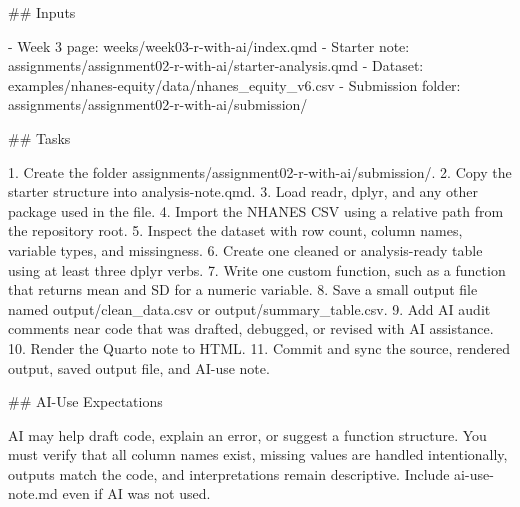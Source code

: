 \documentclass[
  letterpaper,
  DIV=11,
  numbers=noendperiod,
  oneside]{scrreprt}
\newenvironment{Shaded}{\begin{snugshade}}{\end{snugshade}}
\newcommand{\FunctionTok}[1]{\textcolor[rgb]{0.28,0.35,0.67}{#1}}
\newcommand{\InformationTok}[1]{\textcolor[rgb]{0.37,0.37,0.37}{#1}}
\newcommand{\NormalTok}[1]{\textcolor[rgb]{0.00,0.23,0.31}{#1}}
\newcommand{\SpecialStringTok}[1]{\textcolor[rgb]{0.13,0.47,0.30}{#1}}
\begin{document}
\begin{Shaded}
\begin{Highlighting}[numbers=left,,]
\FunctionTok{\#\# Inputs}

\SpecialStringTok{{-} }\NormalTok{Week 3 page: }\InformationTok{\textasciigrave{}weeks/week03{-}r{-}with{-}ai/index.qmd\textasciigrave{}}
\SpecialStringTok{{-} }\NormalTok{Starter note: }\InformationTok{\textasciigrave{}assignments/assignment02{-}r{-}with{-}ai/starter{-}analysis.qmd\textasciigrave{}}
\SpecialStringTok{{-} }\NormalTok{Dataset: }\InformationTok{\textasciigrave{}examples/nhanes{-}equity/data/nhanes\_equity\_v6.csv\textasciigrave{}}
\SpecialStringTok{{-} }\NormalTok{Submission folder: }\InformationTok{\textasciigrave{}assignments/assignment02{-}r{-}with{-}ai/submission/\textasciigrave{}}

\FunctionTok{\#\# Tasks}

\SpecialStringTok{1. }\NormalTok{Create the folder }\InformationTok{\textasciigrave{}assignments/assignment02{-}r{-}with{-}ai/submission/\textasciigrave{}}\NormalTok{.}
\SpecialStringTok{2. }\NormalTok{Copy the starter structure into }\InformationTok{\textasciigrave{}analysis{-}note.qmd\textasciigrave{}}\NormalTok{.}
\SpecialStringTok{3. }\NormalTok{Load }\InformationTok{\textasciigrave{}readr\textasciigrave{}}\NormalTok{, }\InformationTok{\textasciigrave{}dplyr\textasciigrave{}}\NormalTok{, and any other package used in the file.}
\SpecialStringTok{4. }\NormalTok{Import the NHANES CSV using a relative path from the repository root.}
\SpecialStringTok{5. }\NormalTok{Inspect the dataset with row count, column names, variable types, and missingness.}
\SpecialStringTok{6. }\NormalTok{Create one cleaned or analysis{-}ready table using at least three }\InformationTok{\textasciigrave{}dplyr\textasciigrave{}}\NormalTok{ verbs.}
\SpecialStringTok{7. }\NormalTok{Write one custom function, such as a function that returns mean and SD for a numeric variable.}
\SpecialStringTok{8. }\NormalTok{Save a small output file named }\InformationTok{\textasciigrave{}output/clean\_data.csv\textasciigrave{}}\NormalTok{ or }\InformationTok{\textasciigrave{}output/summary\_table.csv\textasciigrave{}}\NormalTok{.}
\SpecialStringTok{9. }\NormalTok{Add AI audit comments near code that was drafted, debugged, or revised with AI assistance.}
\SpecialStringTok{10. }\NormalTok{Render the Quarto note to HTML.}
\SpecialStringTok{11. }\NormalTok{Commit and sync the source, rendered output, saved output file, and AI{-}use note.}

\FunctionTok{\#\# AI{-}Use Expectations}

\NormalTok{AI may help draft code, explain an error, or suggest a function structure. You must verify that all column names exist, missing values are handled intentionally, outputs match the code, and interpretations remain descriptive. Include }\InformationTok{\textasciigrave{}ai{-}use{-}note.md\textasciigrave{}}\NormalTok{ even if AI was not used.}


\end{Highlighting}
\end{Shaded}
\end{document}
